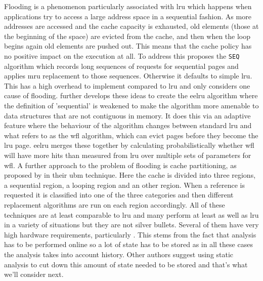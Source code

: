 Flooding is a phenomenon particularly associated with \gls{lru} which happens when applications try to access a large address space in a sequential fashion. As more addresses are accessed and the cache capacity is exhausted, old elements (those at the beginning of the space) are evicted from the cache, and then when the loop begins again old elements are pushed out. This means that the cache policy has no positive impact on the execution at all. To address this \citet{glassAdaptivePageReplacement1997} proposes the \texttt{SEQ} algorithm which records long sequences of requests for sequential pages and applies \gls{mru} replacement to those sequences. Otherwise it defaults to simple \gls{lru}. This has a high overhead to implement compared to \gls{lru} and only considers one cause of flooding. \citet{smaragdakisEELRUSimpleEffective1999} further develops these ideas to create the \gls{eelru} algorithm where the definition of 'sequential' is weakened to make the algorithm more amenable to data structures that are not contiguous in memory. It does this via an adaptive feature where the behaviour of the algorithm changes between standard \gls{lru} and what \citeauthor{smaragdakisEELRUSimpleEffective1999} refers to as the \gls{wfl} algorithm, which can evict pages before they become the \gls{lru} page. \gls{eelru} merges these together by calculating probabilistically whether \gls{wfl} will have more hits than measured from \gls{lru} over multiple sets of parameters for \gls{wfl}. A further approach to the problem of flooding is cache partitioning, as proposed by \citeauthor{kimLowoverheadHighperformanceUnified2000} in their \gls{ubm} technique. Here the cache is divided into three regions, a sequential region, a looping region and an other region. When a reference is requested it is classified into one of the three categories and then different replacement algorithms are run on each region accordingly. All of these techniques are at least comparable to \gls{lru} and many perform at least as well as \gls{lru} in a variety of situations but they are not silver bullets. Several of them have very high hardware requirements, particularly \citet{kimLowoverheadHighperformanceUnified2000}. This stems from the fact that analysis has to be performed online so a lot of state has to be stored as in all these cases the analysis takes into account history. Other authors suggest using static analysis to cut down this amount of state needed to be stored and that's what we'll consider next.

